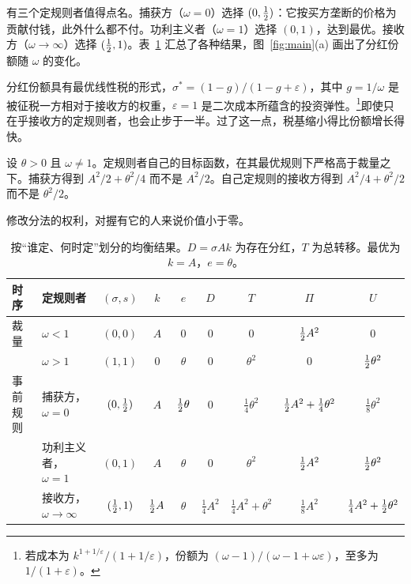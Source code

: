 有三个定规则者值得点名。捕获方（$\omega=0$）选择 $(0,\tfrac{1}{2})$：它按买方垄断的价格为贡献付钱，此外什么都不付。功利主义者（$\omega=1$）选择 $(0,1)$，达到最优。接收方（$\omega\to\infty$）选择 $(\tfrac{1}{2},1)$。表~\ref{tab:regimes} 汇总了各种结果，图~\ref{fig:main}(a) 画出了分红份额随 $\omega$ 的变化。

分红份额具有最优线性税的形式，$\sigma^*=(1-g)/(1-g+\varepsilon)$，其中 $g=1/\omega$ 是被征税一方相对于接收方的权重，$\varepsilon=1$ 是二次成本所蕴含的投资弹性。\footnote{若成本为
$k^{1+1/\varepsilon}/(1+1/\varepsilon)$，份额为 $(\omega-1)/(\omega-1+\omega\varepsilon)$，至多为 $1/(1+\varepsilon)$。}即使只在乎接收方的定规则者，也会止步于一半。过了这一点，税基缩小得比份额增长得快。

\begin{corollary}[每个定规则者都宁愿被约束]\label{cor:bound}
设 $\theta>0$ 且 $\omega\neq 1$。定规则者自己的目标函数，在其最优规则下严格高于裁量之下。捕获方得到 $A^2/2+\theta^2/4$ 而不是 $A^2/2$。自己定规则的接收方得到
$A^2/4+\theta^2/2$ 而不是 $\theta^2/2$。
\end{corollary}

修改分法的权利，对握有它的人来说价值小于零。

\begin{table}[t]
\centering
\caption{按“谁定、何时定”划分的均衡结果。$D=\sigma Ak$ 为存在分红，$T$ 为总转移。最优为 $k=A$，$e=\theta$。}
\label{tab:regimes}
\small
\setlength{\tabcolsep}{5.2pt}
\begin{tabular}{@{}llccccccc@{}}
\toprule
时序 & 定规则者 & $(\sigma,s)$ & $k$ & $e$ & $D$ & $T$ & $\Pi$ & $U$\\
\midrule
裁量 & $\omega<1$ & $(0,0)$ & $A$ & $0$ & $0$ & $0$ & $\tfrac{1}{2} A^2$ & $0$\\[2pt]
     & $\omega>1$ & $(1,1)$ & $0$ & $\theta$ & $0$ & $\theta^2$ & $0$ & $\tfrac{1}{2}\theta^2$\\
\addlinespace[5pt]
事前规则 & 捕获方，$\omega=0$ & $(0,\tfrac{1}{2})$ & $A$ & $\tfrac{1}{2}\theta$ & $0$
           & $\tfrac14\theta^2$ & $\tfrac{1}{2} A^2+\tfrac14\theta^2$ & $\tfrac18\theta^2$\\[2pt]
         & 功利主义者，$\omega=1$ & $(0,1)$ & $A$ & $\theta$ & $0$ & $\theta^2$
           & $\tfrac{1}{2} A^2$ & $\tfrac{1}{2}\theta^2$\\[2pt]
         & 接收方，$\omega\to\infty$ & $(\tfrac{1}{2},1)$ & $\tfrac{1}{2} A$ & $\theta$
           & $\tfrac14A^2$ & $\tfrac14A^2+\theta^2$ & $\tfrac18A^2$
           & $\tfrac14A^2+\tfrac{1}{2}\theta^2$\\
\bottomrule
\end{tabular}
\end{table}

